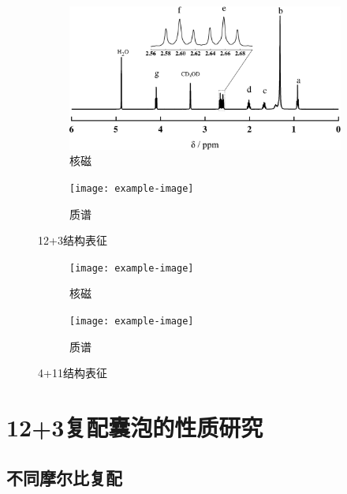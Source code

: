 \documentclass[bachelor,fandolfonts,replaceperiod]{jnuthesis} %
\begin{document}
    \begin{figure}[htbp]
    \centering
        \begin{subfigure}[b]{.475\textwidth}
            \centering
            \includegraphics[width=\textwidth]{figure/nmr123.pdf}
            \caption{核磁}\label{}
        \end{subfigure}
        \hfill
        \begin{subfigure}[b]{.475\textwidth}
            \centering
            \texttt{[image: example-image]}
            \caption{质谱}\label{}
        \end{subfigure}
    \caption{12+3结构表征}\label{fig:cleavable-saa}
    \end{figure}

    \begin{figure}[htbp]
        \centering
        \begin{subfigure}[b]{.475\textwidth}
            \centering
            \texttt{[image: example-image]}
            \caption{核磁}\label{}
        \end{subfigure}
        \hfill
        \begin{subfigure}[b]{.475\textwidth}
            \centering
            \texttt{[image: example-image]}
            \caption{质谱}\label{}
        \end{subfigure}
        \caption{4+11结构表征}\label{fig:cleavable-saa}
    \end{figure}
    
    \section{12+3复配囊泡的性质研究}
    \subsection{不同摩尔比复配}
    
\end{document}
